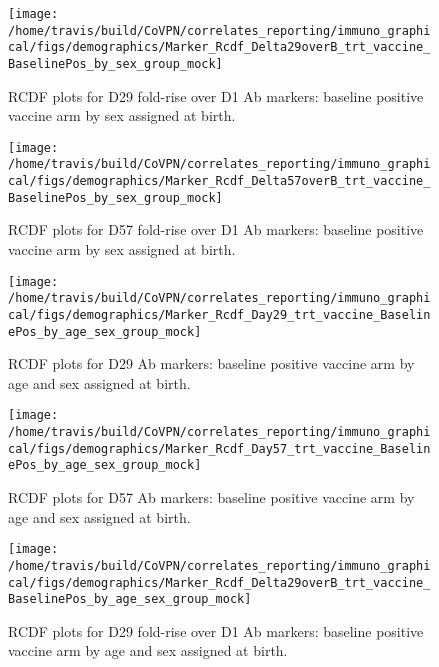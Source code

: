 \documentclass[]{book}
\theoremstyle{definition}
\theoremstyle{definition}
\theoremstyle{definition}
\newcommand{\1}{\mathbbm{1}}
\begin{document}
\clearpage
\begin{figure}[H]

{\centering \texttt{[image: /home/travis/build/CoVPN/correlates\_reporting/immuno\_graphical/figs/demographics/Marker\_Rcdf\_Delta29overB\_trt\_vaccine\_BaselinePos\_by\_sex\_group\_mock]} 

}

\caption{RCDF plots for D29 fold-rise over D1 Ab markers: baseline positive vaccine arm by sex assigned at birth.}\label{fig:unnamed-chunk-106}
\end{figure}

\clearpage
\begin{figure}[H]

{\centering \texttt{[image: /home/travis/build/CoVPN/correlates\_reporting/immuno\_graphical/figs/demographics/Marker\_Rcdf\_Delta57overB\_trt\_vaccine\_BaselinePos\_by\_sex\_group\_mock]} 

}

\caption{RCDF plots for D57 fold-rise over D1 Ab markers: baseline positive vaccine arm by sex assigned at birth.}\label{fig:unnamed-chunk-107}
\end{figure}

\clearpage
\begin{figure}[H]

{\centering \texttt{[image: /home/travis/build/CoVPN/correlates\_reporting/immuno\_graphical/figs/demographics/Marker\_Rcdf\_Day29\_trt\_vaccine\_BaselinePos\_by\_age\_sex\_group\_mock]} 

}

\caption{RCDF plots for D29 Ab markers: baseline positive vaccine arm by age and sex assigned at birth.}\label{fig:unnamed-chunk-108}
\end{figure}

\clearpage
\begin{figure}[H]

{\centering \texttt{[image: /home/travis/build/CoVPN/correlates\_reporting/immuno\_graphical/figs/demographics/Marker\_Rcdf\_Day57\_trt\_vaccine\_BaselinePos\_by\_age\_sex\_group\_mock]} 

}

\caption{RCDF plots for D57 Ab markers: baseline positive vaccine arm by age and sex assigned at birth.}\label{fig:unnamed-chunk-109}
\end{figure}

\clearpage
\begin{figure}[H]

{\centering \texttt{[image: /home/travis/build/CoVPN/correlates\_reporting/immuno\_graphical/figs/demographics/Marker\_Rcdf\_Delta29overB\_trt\_vaccine\_BaselinePos\_by\_age\_sex\_group\_mock]} 

}

\caption{RCDF plots for D29 fold-rise over D1 Ab markers: baseline positive vaccine arm by age and sex assigned at birth.}\label{fig:unnamed-chunk-110}
\end{figure}
\end{document}
